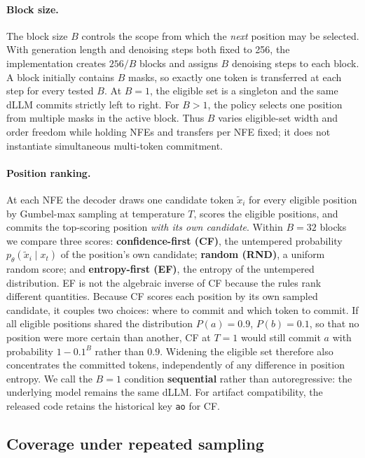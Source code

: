 \documentclass[11pt]{article}
\begin{document}
\paragraph{Block size.}
The block size $B$ controls the scope from which the \emph{next} position may be selected. With generation length and denoising steps both fixed to 256, the implementation creates $256/B$ blocks and assigns $B$ denoising steps to each block. A block initially contains $B$ masks, so exactly one token is transferred at each step for every tested $B$. At $B=1$, the eligible set is a singleton and the same dLLM commits strictly left to right. For $B>1$, the policy selects one position from multiple masks in the active block. Thus $B$ varies eligible-set width and order freedom while holding NFEs and transfers per NFE fixed; it does not instantiate simultaneous multi-token commitment.

\paragraph{Position ranking.}
At each NFE the decoder draws one candidate token $\tilde x_i$ for every eligible position by Gumbel-max sampling at temperature $T$, scores the eligible positions, and commits the top-scoring position \emph{with its own candidate}. Within $B=32$ blocks we compare three scores: \textbf{confidence-first (CF)}, the untempered probability $p_\theta(\tilde x_i\mid x_t)$ of the position's own candidate; \textbf{random (RND)}, a uniform random score; and \textbf{entropy-first (EF)}, the entropy of the untempered distribution. EF is not the algebraic inverse of CF because the rules rank different quantities. Because CF scores each position by its own sampled candidate, it couples two choices: where to commit and which token to commit. If all eligible positions shared the distribution $P(a)=0.9$, $P(b)=0.1$, so that no position were more certain than another, CF at $T=1$ would still commit $a$ with probability $1-0.1^{B}$ rather than $0.9$. Widening the eligible set therefore also concentrates the committed tokens, independently of any difference in position entropy. We call the $B=1$ condition \textbf{sequential} rather than autoregressive: the underlying model remains the same dLLM. For artifact compatibility, the released code retains the historical key \texttt{ao} for CF.

\subsection{Coverage under repeated sampling}
\end{document}
